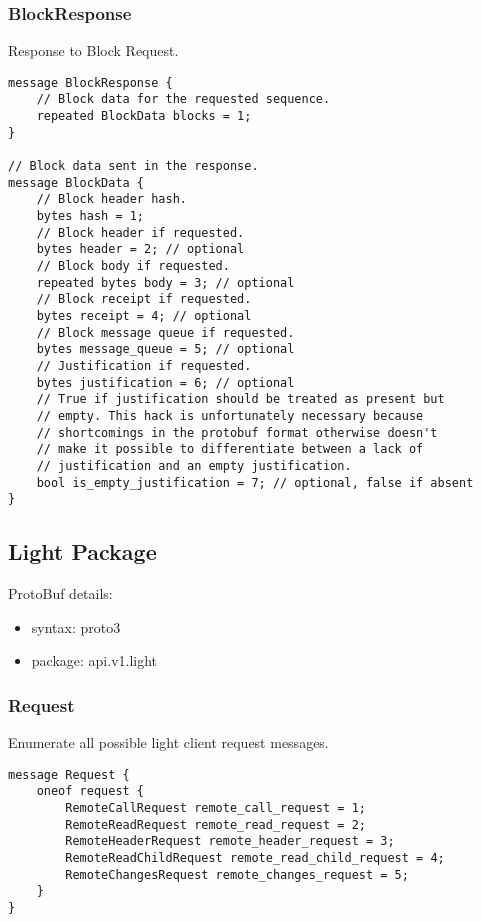 \documentclass{book}
\begin{document}
\subsubsection{BlockResponse}

Response to Block Request.

\begin{lstlisting}[frame=single]
message BlockResponse {
    // Block data for the requested sequence.
    repeated BlockData blocks = 1;
} 

// Block data sent in the response.
message BlockData {
    // Block header hash.
    bytes hash = 1;
    // Block header if requested.
    bytes header = 2; // optional
    // Block body if requested.
    repeated bytes body = 3; // optional
    // Block receipt if requested.
    bytes receipt = 4; // optional
    // Block message queue if requested.
    bytes message_queue = 5; // optional
    // Justification if requested.
    bytes justification = 6; // optional
    // True if justification should be treated as present but
    // empty. This hack is unfortunately necessary because 
    // shortcomings in the protobuf format otherwise doesn't
    // make it possible to differentiate between a lack of 
    // justification and an empty justification.
    bool is_empty_justification = 7; // optional, false if absent
}
\end{lstlisting}

\subsection{Light Package}

ProtoBuf details:

\begin{itemize}
    \item syntax: proto3
    \item package: api.v1.light
\end{itemize}

\subsubsection{Request}

Enumerate all possible light client request messages.

\begin{lstlisting}[frame=single]
message Request {
    oneof request {
        RemoteCallRequest remote_call_request = 1;
        RemoteReadRequest remote_read_request = 2;
        RemoteHeaderRequest remote_header_request = 3;
        RemoteReadChildRequest remote_read_child_request = 4;
        RemoteChangesRequest remote_changes_request = 5;
    }
}
\end{lstlisting}
\end{document}
